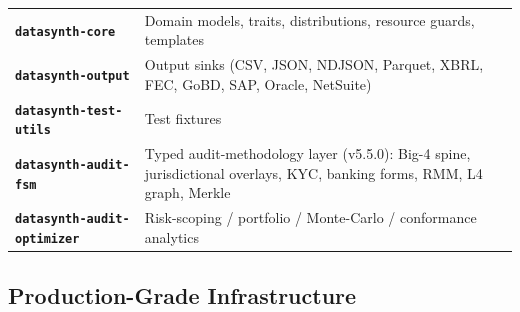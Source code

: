 \documentclass[11pt,a4paper]{article}
\begin{document}
\begin{tabularx}{\textwidth}{@{}>{\bfseries\color{brand}}l X@{}}
\texttt{datasynth-core}            & Domain models, traits, distributions, resource guards, templates \\
\texttt{datasynth-output}          & Output sinks (CSV, JSON, NDJSON, Parquet, XBRL, FEC, GoBD, SAP, Oracle, NetSuite) \\
\texttt{datasynth-test-utils}      & Test fixtures \\
\texttt{datasynth-audit-fsm}       & Typed audit-methodology layer (v5.5.0): Big-4 spine, jurisdictional overlays, KYC, banking forms, RMM, L4 graph, Merkle \\
\texttt{datasynth-audit-optimizer} & Risk-scoping / portfolio / Monte-Carlo / conformance analytics \\
\bottomrule
\end{tabularx}

\subsection{Production-Grade Infrastructure}
\end{document}
